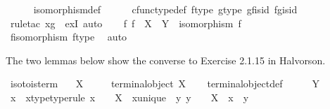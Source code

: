 \begin{isabellebody}
\ \ \ \ \isamarkupfalse%
\ isomorphism{\isacharunderscore}{\kern0pt}def\isanewline
\ \ \ \ \isamarkupfalse%
\ cfunc{\isacharunderscore}{\kern0pt}type{\isacharunderscore}{\kern0pt}def\ f{\isacharunderscore}{\kern0pt}type\ g{\isacharunderscore}{\kern0pt}type\ g{\isacharunderscore}{\kern0pt}f{\isacharunderscore}{\kern0pt}is{\isacharunderscore}{\kern0pt}id\ f{\isacharunderscore}{\kern0pt}g{\isacharunderscore}{\kern0pt}is{\isacharunderscore}{\kern0pt}id\isanewline
\ \ \ \ \isamarkupfalse%
\ {\isacharparenleft}{\kern0pt}rule{\isacharunderscore}{\kern0pt}tac\ x{\isacharequal}{\kern0pt}g\ \ exI{\isacharcomma}{\kern0pt}\ auto{\isacharparenright}{\kern0pt}\isanewline
\isanewline
\ \ \isamarkupfalse%
\ {\isachardoublequoteopen}{\isasymexists}f{\isachardot}{\kern0pt}\ f\ {\isacharcolon}{\kern0pt}\ X\ {\isasymrightarrow}\ Y\ {\isasymand}\ isomorphism\ f{\isachardoublequoteclose}\isanewline
\ \ \ \ \isamarkupfalse%
\ f{\isacharunderscore}{\kern0pt}isomorphism\ f{\isacharunderscore}{\kern0pt}type\ \isamarkupfalse%
\ auto\isanewline
{}\isamarkupfalse%
%
\endisatagproof
{\isafoldproof}%
%
\isadelimproof
%
\endisadelimproof
%
\begin{isamarkuptext}%
The two lemmas below show the converse to Exercise 2.1.15 in Halvorson.%
\end{isamarkuptext}\isamarkuptrue%
\isamarkupfalse%
\ iso{\isacharunderscore}{\kern0pt}to{}{\isacharunderscore}{\kern0pt}is{\isacharunderscore}{\kern0pt}term{\isacharcolon}{\kern0pt}\isanewline
\ \ \ {\isachardoublequoteopen}X\ {\isasymcong}\ {\isasymone}{\isachardoublequoteclose}\isanewline
\ \ \ {\isachardoublequoteopen}terminal{\isacharunderscore}{\kern0pt}object\ X{\isachardoublequoteclose}\isanewline
%
\isadelimproof
\ \ %
\endisadelimproof
%
\isatagproof
{}\isamarkupfalse%
\ terminal{\isacharunderscore}{\kern0pt}object{\isacharunderscore}{\kern0pt}def\isanewline
{}\isamarkupfalse%
\ \isanewline
\ \ \isamarkupfalse%
\ Y\isanewline
\ \ \isamarkupfalse%
\ x\ \ x{\isacharunderscore}{\kern0pt}type{\isacharbrackleft}{\kern0pt}type{\isacharunderscore}{\kern0pt}rule{\isacharbrackright}{\kern0pt}{\isacharcolon}{\kern0pt}\ {\isachardoublequoteopen}x\ {\isacharcolon}{\kern0pt}\ {\isasymone}\ {\isasymrightarrow}\ X{\isachardoublequoteclose}\ \ x{\isacharunderscore}{\kern0pt}unique{\isacharcolon}{\kern0pt}\ {\isachardoublequoteopen}{\isasymforall}\ y{\isachardot}{\kern0pt}\ y\ {\isacharcolon}{\kern0pt}\ {\isasymone}\ {\isasymrightarrow}\ X\ {\isasymlongrightarrow}\ x\ {\isacharequal}{\kern0pt}\ y{\isachardoublequoteclose}\isanewline

\end{isabellebody}
